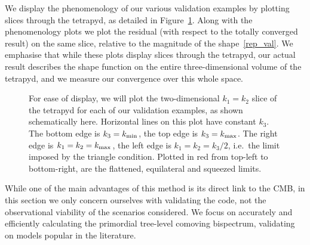 We display the phenomenology of our various validation examples
by plotting slices through the tetrapyd, as detailed in Figure~\ref{slice_explained}.
Along with the phenomenology plots we plot the residual
(with respect to the totally converged result)
on the same slice, relative to the magnitude of the shape~\eqref{rep_val}.
We emphasise that while these plots display slices through the
tetrapyd, our actual result describes the shape function on the
entire three-dimensional volume of the tetrapyd, and
we measure our convergence over this whole space.


\begin{figure}[h!]
\centering
\caption{
    For ease of display, we will plot the two-dimensional $k_1=k_2$ slice of the tetrapyd
    for each of our validation examples, as shown schematically here.
    Horizontal lines on this plot have
    constant $k_3$. The bottom edge is $k_3={k_\text{min}}$, the top
    edge is $k_3={k_\text{max}}$. The right edge is $k_1=k_2={k_\text{max}}$, the
    left edge is $k_1=k_2=k_3/2$, i.e.\ the limit imposed by the triangle condition.
    Plotted in red from top-left to bottom-right,
    are the flattened, equilateral and squeezed limits.
}\label{slice_explained}
\end{figure}


While one of the main advantages of this method is its direct link
to the CMB, in this section we only concern ourselves with validating the
code, not the observational viability of the scenarios considered.
We focus on accurately and efficiently calculating the primordial
tree-level comoving bispectrum, validating on models popular in the
literature.
